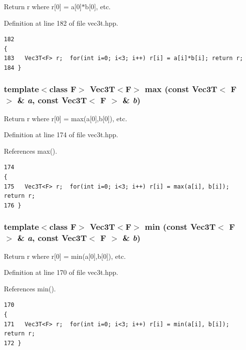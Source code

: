 Return r where r[0] = a[0]$\ast$b[0], etc. 

Definition at line 182 of file vec3t.hpp.

\footnotesize\begin{verbatim}182                                                                               {
183   Vec3T<F> r;  for(int i=0; i<3; i++) r[i] = a[i]*b[i]; return r;
184 }
\end{verbatim}\normalsize 


\subsubsection{\setlength{\rightskip}{0pt plus 5cm}template$<$class F$>$ {\bf Vec3T}$<$F$>$ max (const {\bf Vec3T}$<$ F $>$ \& {\em a}, const {\bf Vec3T}$<$ F $>$ \& {\em b})\hspace{0.3cm}{\tt  [inline]}}\label{vec3t_8hpp_6b9c06ff45e5e69b3cad3af182891c0e_6b9c06ff45e5e69b3cad3af182891c0e}


Return r where r[0] = max(a[0],b[0]), etc. 

Definition at line 174 of file vec3t.hpp.

References max().

\footnotesize\begin{verbatim}174                                                                              {
175   Vec3T<F> r;  for(int i=0; i<3; i++) r[i] = max(a[i], b[i]); return r;
176 }
\end{verbatim}\normalsize 


\subsubsection{\setlength{\rightskip}{0pt plus 5cm}template$<$class F$>$ {\bf Vec3T}$<$F$>$ min (const {\bf Vec3T}$<$ F $>$ \& {\em a}, const {\bf Vec3T}$<$ F $>$ \& {\em b})\hspace{0.3cm}{\tt  [inline]}}\label{vec3t_8hpp_2077885388a08fbc55800ac89f20e8ba_2077885388a08fbc55800ac89f20e8ba}


Return r where r[0] = min(a[0],b[0]), etc. 

Definition at line 170 of file vec3t.hpp.

References min().

\footnotesize\begin{verbatim}170                                                                              {
171   Vec3T<F> r;  for(int i=0; i<3; i++) r[i] = min(a[i], b[i]); return r;
172 }
\end{verbatim}\normalsize 


